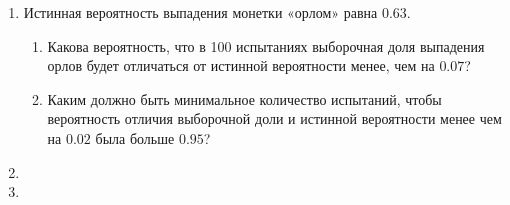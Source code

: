 \documentclass[12pt]{article}
\begin{document}
\begin{enumerate}
\item  Истинная вероятность выпадения монетки «орлом» равна $0.63$.
\begin{enumerate}
\item Какова вероятность, что в 100 испытаниях выборочная доля выпадения орлов будет
отличаться от истинной вероятности менее, чем на $0.07$?
\item Каким должно быть минимальное количество испытаний, чтобы вероятность отличия
выборочной доли и истинной вероятности менее чем на $0.02$ была больше $0.95$?
\end{enumerate}

\item 
\item 



\end{enumerate}
\end{document}
